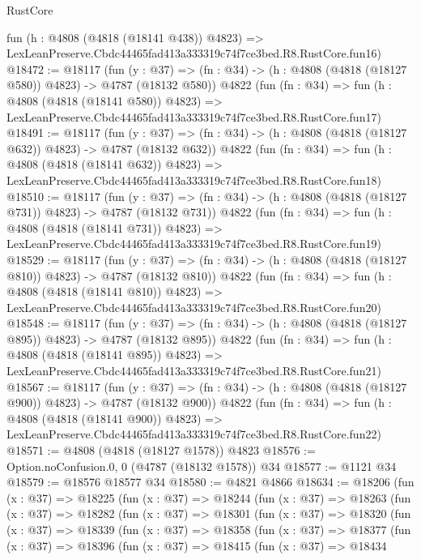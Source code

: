 \begin{lexlean}{RustCore}
\begin{coremodule}
    fun (h : @4808 (@4818 (@18141 @438)) @4823) =>
    LexLeanPreserve.Cbdc44465fad413a333319c74f7ce3bed.R8.RustCore.fun16)
@18472 := @18117
    (fun (y : @37) => (fn : @34) -> (h : @4808 (@4818 (@18127 @580)) @4823) -> @4787 (@18132 @580))
    @4822
    (fun (fn : @34) =>
    fun (h : @4808 (@4818 (@18141 @580)) @4823) =>
    LexLeanPreserve.Cbdc44465fad413a333319c74f7ce3bed.R8.RustCore.fun17)
@18491 := @18117
    (fun (y : @37) => (fn : @34) -> (h : @4808 (@4818 (@18127 @632)) @4823) -> @4787 (@18132 @632))
    @4822
    (fun (fn : @34) =>
    fun (h : @4808 (@4818 (@18141 @632)) @4823) =>
    LexLeanPreserve.Cbdc44465fad413a333319c74f7ce3bed.R8.RustCore.fun18)
@18510 := @18117
    (fun (y : @37) => (fn : @34) -> (h : @4808 (@4818 (@18127 @731)) @4823) -> @4787 (@18132 @731))
    @4822
    (fun (fn : @34) =>
    fun (h : @4808 (@4818 (@18141 @731)) @4823) =>
    LexLeanPreserve.Cbdc44465fad413a333319c74f7ce3bed.R8.RustCore.fun19)
@18529 := @18117
    (fun (y : @37) => (fn : @34) -> (h : @4808 (@4818 (@18127 @810)) @4823) -> @4787 (@18132 @810))
    @4822
    (fun (fn : @34) =>
    fun (h : @4808 (@4818 (@18141 @810)) @4823) =>
    LexLeanPreserve.Cbdc44465fad413a333319c74f7ce3bed.R8.RustCore.fun20)
@18548 := @18117
    (fun (y : @37) => (fn : @34) -> (h : @4808 (@4818 (@18127 @895)) @4823) -> @4787 (@18132 @895))
    @4822
    (fun (fn : @34) =>
    fun (h : @4808 (@4818 (@18141 @895)) @4823) =>
    LexLeanPreserve.Cbdc44465fad413a333319c74f7ce3bed.R8.RustCore.fun21)
@18567 := @18117
    (fun (y : @37) => (fn : @34) -> (h : @4808 (@4818 (@18127 @900)) @4823) -> @4787 (@18132 @900))
    @4822
    (fun (fn : @34) =>
    fun (h : @4808 (@4818 (@18141 @900)) @4823) =>
    LexLeanPreserve.Cbdc44465fad413a333319c74f7ce3bed.R8.RustCore.fun22)
@18571 := @4808 (@4818 (@18127 @1578)) @4823
@18576 := Option.noConfusion.{0, 0} (@4787 (@18132 @1578)) @34
@18577 := @1121 @34
@18579 := @18576 @18577 @34
@18580 := @4821 @4866
@18634 := @18206
    (fun (x : @37) =>
    @18225
      (fun (x : @37) =>
      @18244
        (fun (x : @37) =>
        @18263
          (fun (x : @37) =>
          @18282
            (fun (x : @37) =>
            @18301
              (fun (x : @37) =>
              @18320
                (fun (x : @37) =>
                @18339
                  (fun (x : @37) =>
                  @18358
                    (fun (x : @37) =>
                    @18377
                      (fun (x : @37) =>
                      @18396
                        (fun (x : @37) =>
                        @18415
                          (fun (x : @37) =>
                          @18434

\end{coremodule}
\end{lexlean}
